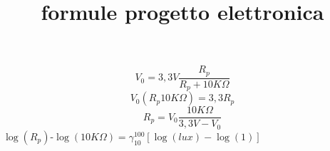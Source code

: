 \documentclass{article}
\title{formule progetto elettronica}
\begin{document}
	
	\[V_0=3,3V\frac{R_p}{R_p+10K\Omega}\]	\[V_0(R_p10K\Omega)=3,3R_p\]
	\[R_p=V_0\frac{10K\Omega}{3,3V-V_0}\]
	$\log(R_p)$-$\log(10K\Omega)=\gamma^{100}_{10}[\log(lux)-\log(1)]$
	
\end{document}
